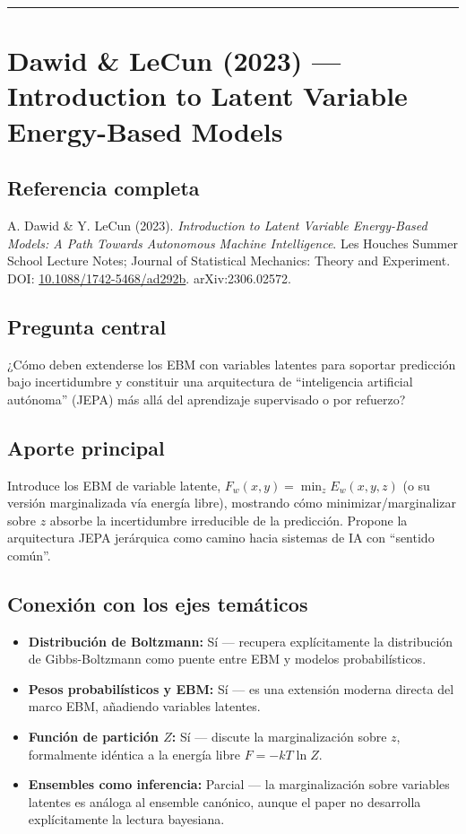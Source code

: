\documentclass[12pt]{article}
\begin{document}
\bigskip
\hrule
\bigskip

\section{Dawid \& LeCun (2023) --- Introduction to Latent Variable Energy-Based Models}

\subsection*{Referencia completa}
A. Dawid \& Y. LeCun (2023). \textit{Introduction to Latent Variable Energy-Based Models: A
Path Towards Autonomous Machine Intelligence}. Les Houches Summer School Lecture Notes;
Journal of Statistical Mechanics: Theory and Experiment. DOI:
\href{https://doi.org/10.1088/1742-5468/ad292b}{10.1088/1742-5468/ad292b}. arXiv:2306.02572.
\cite{dawid2023}

\subsection*{Pregunta central}
¿Cómo deben extenderse los EBM con variables latentes para soportar predicción bajo
incertidumbre y constituir una arquitectura de ``inteligencia artificial autónoma'' (JEPA) más
allá del aprendizaje supervisado o por refuerzo?

\subsection*{Aporte principal}
Introduce los EBM de variable latente, $F_w(x,y)=\min_z E_w(x,y,z)$ (o su versión
marginalizada vía energía libre), mostrando cómo minimizar/marginalizar sobre $z$ absorbe la
incertidumbre irreducible de la predicción. Propone la arquitectura JEPA jerárquica como camino
hacia sistemas de IA con ``sentido común''.

\subsection*{Conexión con los ejes temáticos}
\begin{itemize}
  \item \textbf{Distribución de Boltzmann:} Sí --- recupera explícitamente la distribución de Gibbs-Boltzmann como puente entre EBM y modelos probabilísticos.
  \item \textbf{Pesos probabilísticos y EBM:} Sí --- es una extensión moderna directa del marco EBM, añadiendo variables latentes.
  \item \textbf{Función de partición $Z$:} Sí --- discute la marginalización sobre $z$, formalmente idéntica a la energía libre $F=-kT\ln Z$.
  \item \textbf{Ensembles como inferencia:} Parcial --- la marginalización sobre variables latentes es análoga al ensemble canónico, aunque el paper no desarrolla explícitamente la lectura bayesiana.
\end{itemize}
\end{document}
